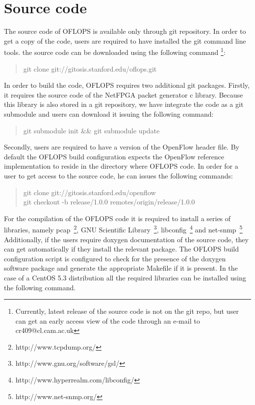 \documentclass{book}
\begin{document}
\section{Source code}

The source code of OFLOPS is available only through git repository.
In order to get a copy of the code, users are required to have installed 
the git command line tools. the source code can be downloaded using the 
following command \footnote{Currently, latest release of the source code is not 
  on the git repo, but user can get an early access view of the code through 
    an e-mail to cr409@cl.cam.ac.uk}: 
    \begin{quote}
    git clone git://gitosis.stanford.edu/oflops.git
    \end{quote}

    In order to build the code, OFLOPS requires two additional git packages. 
    Firstly, it requires the source code of the NetFPGA packet 
    generator c library. Because this library is also stored in a git repository, 
    we have integrate the code as a git submodule and users can download it
    issuing the following command:

    \begin{quote}
    git submodule init \&\& git submodule update
    \end{quote}

    Secondly, users are required to have a version of the OpenFlow header file.
    By default the OFLOPS build configuration expects the OpenFlow reference
    implementation to reside in the directory where OFLOPS code. In order
    for a user to get access to the source code, he can issues the following
    commands:

    \begin{quote}
    git clone git://gitosis.stanford.edu/openflow \\
      git checkout -b release/1.0.0 remotes/origin/release/1.0.0
      \end{quote}

      For the compilation of the OFLOPS code it is required to install a
      series of libraries, namely pcap~\footnote{http://www.tcpdump.org/}, 
      GNU Scientific Library~\footnote{http://www.gnu.org/software/gsl/}, 
      libconfig~\footnote{http://www.hyperrealm.com/libconfig/} 
      and net-snmp~\footnote{http://www.net-snmp.org/} Additionally, if the users 
      require doxygen documentation of the source code, they can get automatically 
      if they install the relevant package. The OFLOPS build configuration script 
      is configured to check for the presence of the 
      doxygen software package and generate the appropriate Makefile if it is 
      present. In the case of a CentOS 5.3 distribution all the required libraries 
      can be installed using the following command.
\end{document}
